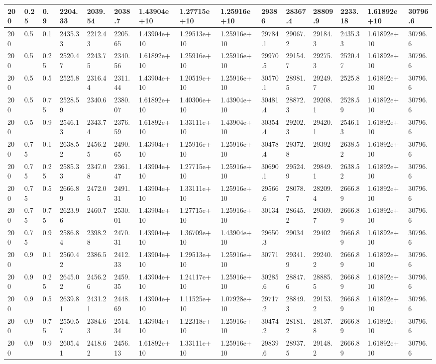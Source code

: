 \begin{table}[!htbp]
\begin{tabularx}{\textwidth}{|p{0.4cm}|*{2}{p{0.2cm}|}*{12}{X|}}
200&0.25&0.9&2204.33&2039.54&2038.7&1.43904e+10&1.27715e+10&1.25916e+10&29386&28367.4&28809.9&2233.18&1.61892e+10&30796.6\\\hline
200&0.5&0.1&2435.33&2212.43&2205.65&1.43904e+10&1.29513e+10&1.25916e+10&29784.1&29067.2&29184.3&2435.33&1.61892e+10&30796.6\\\hline
200&0.5&0.25&2520.47&2243.75&2340.56&1.61892e+10&1.25916e+10&1.25916e+10&29970.5&29154.7&29275.3&2520.47&1.61892e+10&30796.6\\\hline
200&0.5&0.5&2525.8&2316.44&2311.44&1.43904e+10&1.20519e+10&1.25916e+10&30570.1&28981.5&29249.7&2525.8&1.61892e+10&30796.6\\\hline
200&0.5&0.75&2528.59&2340.6&2380.07&1.61892e+10&1.40306e+10&1.43904e+10&30481.4&28872.3&29208.1&2528.59&1.61892e+10&30796.6\\\hline
200&0.5&0.9&2546.13&2343.74&2376.59&1.61892e+10&1.33111e+10&1.43904e+10&30354.4&29202.3&29420.1&2546.13&1.61892e+10&30796.6\\\hline
200&0.75&0.1&2638.52&2456.25&2490.65&1.43904e+10&1.25916e+10&1.25916e+10&30478.4&29372.8&29392&2638.52&1.61892e+10&30796.6\\\hline
200&0.75&0.25&2585.33&2347.08&2361.47&1.43904e+10&1.27715e+10&1.25916e+10&30690.1&29524.9&29849.1&2638.52&1.61892e+10&30796.6\\\hline
200&0.75&0.5&2666.89&2472.05&2491.31&1.43904e+10&1.33111e+10&1.25916e+10&29566.6&28078.7&28209.4&2666.89&1.61892e+10&30796.6\\\hline
200&0.75&0.75&2623.96&2460.7&2530.01&1.43904e+10&1.27715e+10&1.25916e+10&30134&28645.2&29369.7&2666.89&1.61892e+10&30796.6\\\hline
200&0.75&0.9&2586.84&2398.28&2470.31&1.43904e+10&1.36709e+10&1.43904e+10&29650.3&29034&29402&2666.89&1.61892e+10&30796.6\\\hline
200&0.9&0.1&2560.42&2386.5&2412.33&1.43904e+10&1.29513e+10&1.25916e+10&30771&29341.9&29240.2&2666.89&1.61892e+10&30796.6\\\hline
200&0.9&0.25&2645.02&2456.26&2459.35&1.43904e+10&1.24117e+10&1.25916e+10&30285.6&28847.6&28885.5&2666.89&1.61892e+10&30796.6\\\hline
200&0.9&0.5&2639.81&2431.21&2448.69&1.43904e+10&1.11525e+10&1.07928e+10&29717.2&28849.3&29153.2&2666.89&1.61892e+10&30796.6\\\hline
200&0.9&0.75&2550.57&2384.63&2514.34&1.43904e+10&1.22318e+10&1.25916e+10&30474.2&28181.2&28137.8&2666.89&1.61892e+10&30796.6\\\hline
200&0.9&0.9&2605.41&2418.62&2456.13&1.61892e+10&1.33111e+10&1.25916e+10&29839.6&28937.5&29148.2&2666.89&1.61892e+10&30796.6\\\hline

\end{tabularx}
\end{table}
